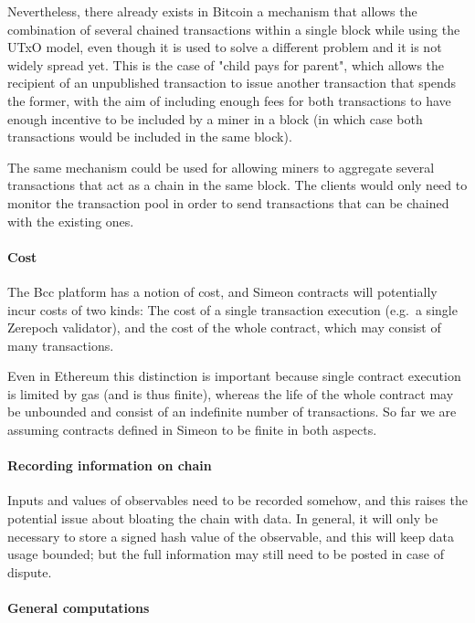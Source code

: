 \documentclass[runningheads]{llncs}
\begin{document}
Nevertheless, there already exists in Bitcoin a mechanism that allows the combination of several chained transactions 
within a single block while using the UTxO model, even though it is used to solve a different problem and it is not 
widely spread yet. This is the case of "child pays for parent", which allows the recipient of an unpublished transaction 
to issue another transaction that spends the former, with the aim of including enough fees for both transactions to have 
enough incentive to be included by a miner in a block (in which case both transactions would be included in the same 
block).

The same mechanism could be used for allowing miners to aggregate several transactions that act as a chain in the same 
block. The clients would only need to monitor the transaction pool in order to send transactions that can be chained 
with the existing ones.

\paragraph{Cost}

The Bcc platform has a notion of cost, and Simeon contracts will potentially incur costs of two kinds: The cost of 
a single transaction execution (e.g.\ a single Zerepoch validator), and the cost of the whole contract, which may consist 
of many transactions.

Even in Ethereum this distinction is important because single contract execution is limited by gas (and is thus 
finite), whereas the life of the whole contract may be unbounded and consist of an indefinite number of transactions.  
So far we are assuming contracts defined in Simeon to be finite in both aspects. 

\paragraph{Recording information on chain}

Inputs and values of observables need to be recorded somehow, and this raises the potential issue about bloating 
the chain with data. In general, it will only be necessary to store a signed hash value of the observable, and this will 
keep data usage bounded; but the full information may still need to be posted in case of dispute.


\paragraph{General computations}
\end{document}
